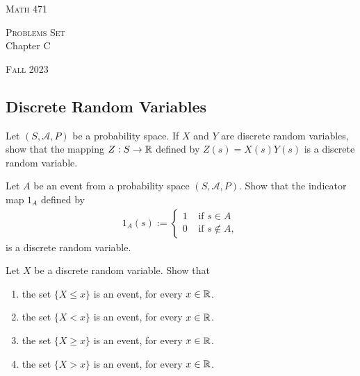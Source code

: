 


\hrulefill

\begin{minipage}{0.33\textwidth}
\textsc{Math 471}
\end{minipage} \hfill 
\begin{minipage}{0.32\textwidth}
\centering
\textsc{Problems Set} \\
Chapter C
\end{minipage}
 \hfill 
 \begin{minipage}{0.33\textwidth}
 \flushright \textsc{Fall 2023}
 \end{minipage}

\hrulefill

\setcounter{section}{3}

\subsection{Discrete Random Variables}
    
    \begin{problem}
    Let $(S, \mathcal{A}, P)$ be a probability space. If $X$ and $Y$ are discrete random variables, show that the mapping $Z : S \rightarrow \mathbb{R}$ defined by $Z(s) = X(s)Y(s)$ is a discrete random variable.
    \end{problem}

    \begin{problem}
    Let $A$ be an event from a probability space $(S , \mathcal{A}, P)$. Show that the indicator map $1_A$ defined by
        \begin{align*}
        1_A (s) := \left\{ \begin{matrix}
        1 & \text{ if } s \in A \\
        0 & \text{ if } s \not\in A , \end{matrix}
        \right.
        \end{align*} 
    is a discrete random variable.
    \end{problem}

    \begin{problem}\label{P:EquivalentEvents}
    Let $X$ be a discrete random variable. Show that
        \begin{enumerate}[label=\alph*)]
        \item the set $\{ X \leq x \}$ is an event, for every $x \in \mathbb{R}$.
        \item the set $\{ X < x \}$ is an event, for every $x \in \mathbb{R}$.
        \item the set $\{ X \geq x \}$ is an event, for every $x \in \mathbb{R}$.
        \item the set $\{ X > x \}$ is an event, for every $x \in \mathbb{R}$.
    \end{enumerate}
    \end{problem}

